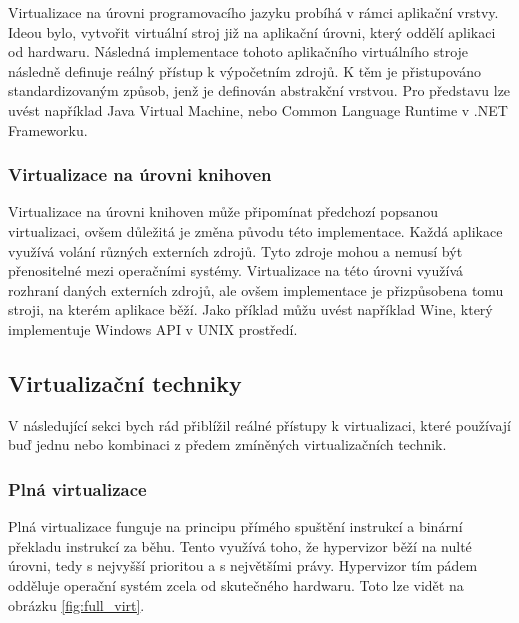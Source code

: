 Virtualizace na úrovni programovacího jazyku probíhá v rámci aplikační vrstvy. Ideou bylo, vytvořit virtuální stroj již na aplikační úrovni, který oddělí aplikaci od hardwaru. Následná implementace tohoto aplikačního virtuálního stroje následně definuje reálný přístup k výpočetním zdrojů. K těm je přistupováno standardizovaným způsob, jenž je definován abstrakční vrstvou. Pro představu lze uvést například Java Virtual Machine, nebo Common Language Runtime v .NET Frameworku. \cite{chiueh2005survey}


\subsubsection{Virtualizace na úrovni knihoven}

Virtualizace na úrovni knihoven může připomínat předchozí popsanou virtualizaci, ovšem důležitá je změna původu této implementace. Každá aplikace využívá volání různých externích zdrojů. Tyto zdroje mohou a nemusí být přenositelné mezi operačními systémy. Virtualizace na této úrovni využívá rozhraní daných externích zdrojů, ale ovšem implementace je přizpůsobena tomu stroji, na kterém aplikace běží. Jako příklad můžu uvést například Wine, který implementuje Windows API v UNIX prostředí. 


\subsection{Virtualizační techniky}

V následující sekci bych rád přiblížil reálné přístupy k virtualizaci, které používají buď jednu nebo kombinaci z předem zmíněných virtualizačních technik.

\subsubsection{Plná virtualizace}

Plná virtualizace funguje na principu přímého spuštění instrukcí a binární překladu instrukcí za běhu. Tento využívá toho, že hypervizor běží na nulté úrovni, tedy s nejvyšší prioritou a s největšími právy. Hypervizor tím pádem odděluje operační systém zcela od skutečného hardwaru. Toto lze vidět na obrázku \ref{fig:full_virt}.\cite{4709159}

